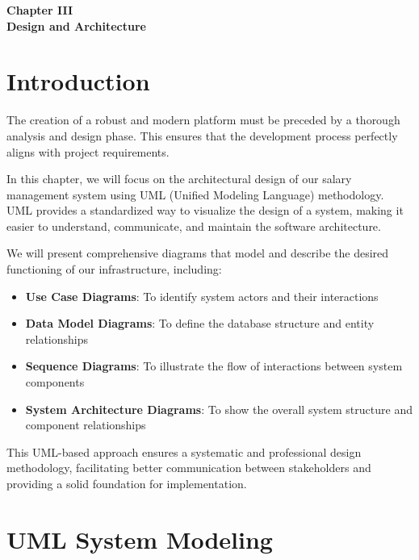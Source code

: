 \documentclass[a4paper,12pt]{report}
\begin{document}
\setcounter{chapter}{3}
\begin{doublespace}
{}
\vspace*{10cm}
\centering
\textbf{ \huge Chapter III \\ [1 cm] Design and Architecture}
\end{doublespace}
\setcounter{section}{0}
\cleardoublepage
\fancyhead[R]{\nouppercase{\rightmark}}
\begin{doublespace}
\section*{Introduction}
\hspace{1cm}The creation of a robust and modern platform must be preceded by a thorough analysis and design phase. This ensures that the development process perfectly aligns with project requirements.

In this chapter, we will focus on the architectural design of our salary management system using UML (Unified Modeling Language) methodology. UML provides a standardized way to visualize the design of a system, making it easier to understand, communicate, and maintain the software architecture.

We will present comprehensive diagrams that model and describe the desired functioning of our infrastructure, including:
\begin{itemize}
    \item \textbf{Use Case Diagrams}: To identify system actors and their interactions
    \item \textbf{Data Model Diagrams}: To define the database structure and entity relationships
    \item \textbf{Sequence Diagrams}: To illustrate the flow of interactions between system components
    \item \textbf{System Architecture Diagrams}: To show the overall system structure and component relationships
\end{itemize}

This UML-based approach ensures a systematic and professional design methodology, facilitating better communication between stakeholders and providing a solid foundation for implementation.

\section{UML System Modeling}


\end{doublespace}
\end{document}
